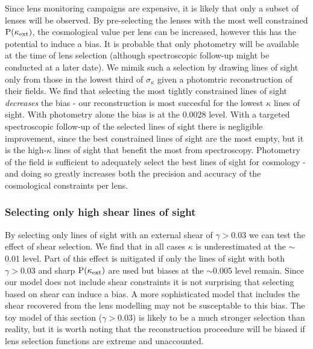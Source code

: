 \documentclass[useAMS,usenatbib]{mn2e}
\begin{document}
Since lens monitoring campaigns are expensive, it is likely that only a
subset of lenses will be observed. By pre-selecting the lenses with the
most well constrained ${\rm P}(\kappa_{\rm ext})$, the cosmological value per lens
can be increased, however this has the potential to induce a bias. It is
probable that only photometry will be available at the time of lens
selection (although spectroscopic follow-up might be conducted at a
later date). We mimik such a selection by drawing lines of sight only
from those in the lowest third of $\sigma_{\kappa}$ given a photomtric
reconstruction of their fields. We find that selecting the most tightly
constrained lines of sight {\it decreases} the bias - our reconstruction
is most succesful for the lowest $\kappa$ lines of sight. With
photometry alone the bias is at the 0.0028 level. With a targeted
spectroscopic follow-up of the selected lines of sight there is
negligible improvement, since the best constrained lines of sight are
the most empty, but it is the high-$\kappa$ lines of sight that benefit
the most from spectroscopy. Photometry of the field is sufficient to
adequately select the best lines of sight for cosmology - and doing so
greatly increases both the precision and accuracy of the cosmological
constraints per lens.

\subsubsection{Selecting only high shear lines of sight}

By selecting only lines of sight with an external shear of $\gamma>0.03$ we can test the effect of shear selection. We find that in all cases $\kappa$ is underestimated at the $\sim$0.01 level. Part of this effect is mitigated if only the lines of sight with both $\gamma>0.03$ and sharp ${\rm P}(\kappa_{\rm ext})$ are used but biases at the $\sim$0.005 level remain. Since our model does not include shear constraints it is not surprising that selecting based on shear can induce a bias. A more sophisticated model that includes the shear recovered from the lens modelling may not be susceptable to this bias. The toy model of this section ($\gamma>0.03$) is likely to be a much stronger selection than reality, but it is worth noting that the reconstruction proceedure will be biased if lens selection functions are extreme and unaccounted.
\end{document}
